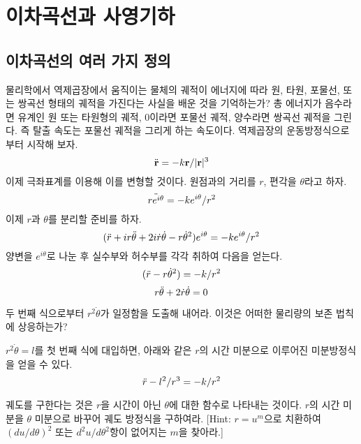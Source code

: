 \chapter{이차곡선과 사영기하}
\section{이차곡선의 여러 가지 정의}
물리학에서 역제곱장에서 움직이는 물체의 궤적이 에너지에 따라 원, 타원, 포물선, 또는 쌍곡선 형태의 궤적을 가진다는 사실을 배운 것을 기억하는가? 총 에너지가 음수라면 유계인 원 또는 타원형의 궤적, 0이라면 포물선 궤적, 양수라면 쌍곡선 궤적을 그린다. 즉 탈출 속도는 포물선 궤적을 그리게 하는 속도이다. 역제곱장의 운동방정식으로부터 시작해 보자. 
\begin{equation*}
    \Ddot{\textbf{r}}=-k\textbf{r}/|\textbf{r}|^3
\end{equation*}
이제 극좌표계를 이용해 이를 변형할 것이다. 원점과의 거리를 $r$, 편각을 $\theta$라고 하자. 
\begin{equation*}
    \Ddot{re^{i\theta}}=-ke^{i\theta}/r^2
\end{equation*}
이제 $r$과 $\theta$를 분리할 준비를 하자. 
\begin{equation*}
    (\Ddot{r}+ir\Ddot{\theta}+2i\Dot{r}\Dot{\theta}-r\Dot{\theta}^2)e^{i\theta}=-ke^{i\theta}/r^2
\end{equation*}
양변을 $e^{i\theta}$로 나눈 후 실수부와 허수부를 각각 취하여 다음을 얻는다. 
\begin{equation*}
    (\Ddot{r}-r\Dot{\theta}^2)=-k/r^2
\end{equation*}
\begin{equation*}
    r\Ddot{\theta}+2\Dot{r}\Dot{\theta}=0
\end{equation*}
\begin{exercise}
    두 번째 식으로부터 $r^2\Dot{\theta}$가 일정함을 도출해 내어라. 이것은 어떠한 물리량의 보존 법칙에 상응하는가?
\end{exercise}
$r^2\Dot{\theta}=l$를 첫 번째 식에 대입하면, 아래와 같은 $r$의 시간 미분으로 이루어진 미분방정식을 얻을 수 있다. 
\begin{equation*}
    \Ddot{r}-l^2/r^3=-k/r^2
\end{equation*}
\begin{exercise}
    궤도를 구한다는 것은 $r$을 시간이 아닌 $\theta$에 대한 함수로 나타내는 것이다. $r$의 시간 미분을 $\theta$ 미분으로 바꾸어 궤도 방정식을 구하여라. [Hint: $r=u^m$으로 치환하여 $(du/d\theta)^2$ 또는 $d^2u/d\theta^2$항이 없어지는 $m$을 찾아라.]    
\end{exercise}
